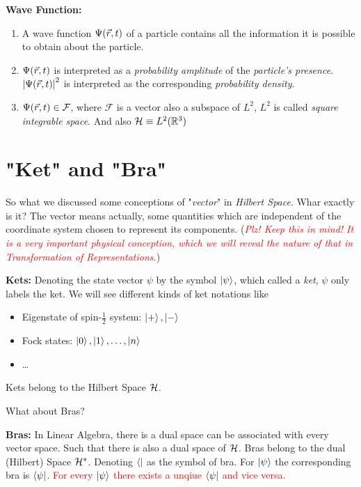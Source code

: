 \begin{definition}{\textbf{Wave Function:}}
    \begin{enumerate}
        \item A wave function $\Psi(\vec{r},t)$ of a particle contains all the information it is possible to obtain about the particle. 
        \item $\Psi(\vec{r},t)$ is interpreted as a \textit{probability amplitude} of the \textit{particle's presence}. $\left| \Psi(\vec{r},t) \right|^2$ is interpreted as the corresponding \textit{probability density}. 
        \item $\Psi(\vec{r},t) \in \mathcal{F}$, where $\mathcal{F}$ is a vector also a subspace of $L^2$, $L^2$ is called \textit{square integrable space}. And also $\mathcal{H} \equiv L^2(\mathbb{R}^3)$
    \end{enumerate}
\end{definition}
\newpage
\section{"Ket" and "Bra"}
So what we discussed some conceptions of "\textit{vector}" in \textit{Hilbert Space}. Whar exactly is it? The vector means actually, some quantities which are independent of the coordinate system chosen to represent its components. (\emph{\textcolor{red}{Plz! Keep this in mind! It is a very important physical conception, which we will reveal the nature of that in Transformation of Representations.}})

\begin{definition}{\textbf{Kets:}}
    Denoting the state vector $\psi$ by the symbol $\ket{\psi}$, which called a \emph{ket}, $\psi$ only labels the ket. We will see different kinds of ket notations like 
    \begin{itemize}
        \item Eigenstate of spin-$\frac{1}{2}$ system: $\ket{+},\ket{-}$
        \item Fock states: $\ket{0},\ket{1},\dots,\ket{n}$
        \item \dots
    \end{itemize}
    Kets belong to the Hilbert Space $\mathcal{H}$.
\end{definition}
What about Bras?
\begin{definition}{\textbf{Bras:}}
    In Linear Algebra, there is a dual space can be associated with every vector space. Such that there is also a dual space of $\mathcal{H}$. Bras belong to the dual (Hilbert) Space $\mathcal{H}^*$. Denoting $\bra{}$ as the symbol of bra. For $\ket{\psi}$ the corresponding bra is $\bra{\psi} $. \textcolor{red}{For every $\ket{\psi}$ there exists a unqiue $\bra{\psi}$ and vice versa.} 
\end{definition}

